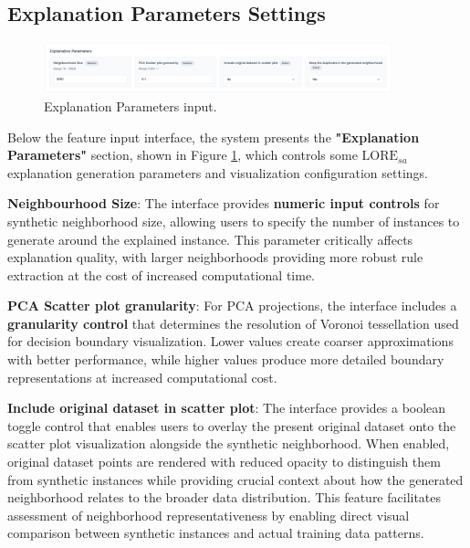 \subsection{Explanation Parameters Settings}

\begin{figure}[htbp]
  \centering
  \includegraphics[width=0.9\textwidth]{images/ExplanationParameters.png}
  \caption{Explanation Parameters input.}
  \label{fig:ExplanationParameters}
\end{figure}

Below the feature input interface, the system presents the \textbf{"Explanation Parameters"} section, shown in Figure \ref{fig:ExplanationParameters}, which controls some $\text{LORE}_{sa}$ explanation generation parameters and visualization configuration settings.

\textbf{Neighbourhood Size}: The interface provides \textbf{numeric input controls} for synthetic neighborhood size, allowing users to specify the number of instances to generate around the explained instance. This parameter critically affects explanation quality, with larger neighborhoods providing more robust rule extraction at the cost of increased computational time.

\textbf{PCA Scatter plot granularity}: For PCA projections, the interface includes a \textbf{granularity control} that determines the resolution of Voronoi tessellation used for decision boundary visualization. Lower values create coarser approximations with better performance, while higher values produce more detailed boundary representations at increased computational cost.

\textbf{Include original dataset in scatter plot}: The interface provides a boolean toggle control that enables users to overlay the present original dataset onto the scatter plot visualization alongside the synthetic neighborhood. When enabled, original dataset points are rendered with reduced opacity to distinguish them from synthetic instances while providing crucial context about how the generated neighborhood relates to the broader data distribution. This feature facilitates assessment of neighborhood representativeness by enabling direct visual comparison between synthetic instances and actual training data patterns.

